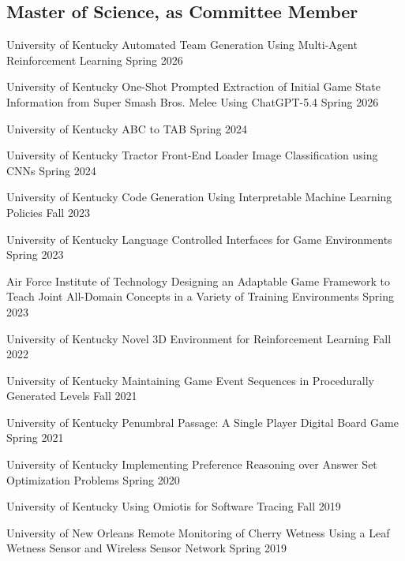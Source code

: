 \documentclass{cv}
\begin{document}
\subsection*{Master of Science, as Committee Member}
\begin{etaremune}[itemsep=0pt,parsep=0pt]
	\item {}
		{University of Kentucky}
		{Automated Team Generation Using Multi-Agent Reinforcement Learning}
		{Spring 2026}
	\item {}
		{University of Kentucky}
		{One-Shot Prompted Extraction of Initial Game State Information from Super Smash Bros. Melee Using ChatGPT-5.4}
		{Spring 2026}
	\item {}
		{University of Kentucky}
		{ABC to TAB}
		{Spring 2024}
	\item {}
		{University of Kentucky}
		{Tractor Front-End Loader Image Classification using CNNs}
		{Spring 2024}
	\item {}
		{University of Kentucky}
		{Code Generation Using Interpretable Machine Learning Policies}
		{Fall 2023}
	\item {}
		{University of Kentucky}
		{Language Controlled Interfaces for Game Environments}
		{Spring 2023}
	\item {}
		{Air Force Institute of Technology}
		{Designing an Adaptable Game Framework to Teach Joint All-Domain Concepts in a Variety of Training Environments}
		{Spring 2023}
	\item {}
		{University of Kentucky}
		{Novel 3D Environment for Reinforcement Learning}
		{Fall 2022}
	\item {}
		{University of Kentucky}
		{Maintaining Game Event Sequences in Procedurally Generated Levels}
		{Fall 2021}
	\item {}
		{University of Kentucky}
		{Penumbral Passage: A Single Player Digital Board Game}
		{Spring 2021}
	\item {}
		{University of Kentucky}
		{Implementing Preference Reasoning over Answer Set Optimization Problems}
		{Spring 2020}
	\item {}
		{University of Kentucky}
		{Using Omiotis for Software Tracing}
		{Fall 2019}
	\item {}
		{University of New Orleans}
		{Remote Monitoring of Cherry Wetness Using a Leaf Wetness Sensor and Wireless Sensor Network}
		{Spring 2019}
\end{etaremune}
\end{document}
